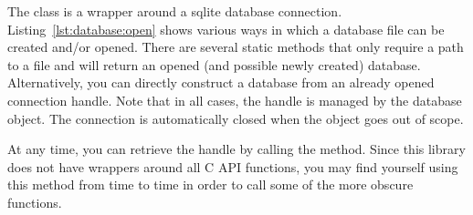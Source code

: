 The  class is a wrapper around a sqlite database connection. Listing~\ref{lst:database:open} shows various ways in which a database file can be created and/or opened. There are several static methods that only require a path to a file and will return an opened (and possible newly created) database. Alternatively, you can directly construct a database from an already opened connection handle. Note that in all cases, the handle is managed by the database object. The connection is automatically closed when the object goes out of scope.



At any time, you can retrieve the handle by calling the  method. Since this library does not have wrappers around all C API functions, you may find yourself using this method from time to time in order to call some of the more obscure  functions.
